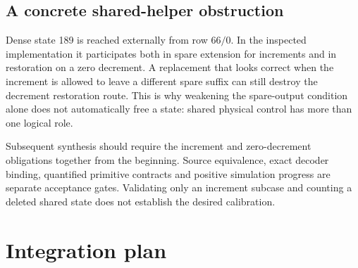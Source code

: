 \documentclass[11pt,letterpaper]{article}
\theoremstyle{definition}\newtheorem{definition}[theorem]{Definition}
\begin{document}
\subsection{A concrete shared-helper obstruction}

Dense state 189 is reached externally from row $66/0$. In the inspected
implementation it participates both in spare extension for increments and in
restoration on a zero decrement. A replacement that looks correct when the
increment is allowed to leave a different spare suffix can still destroy the
decrement restoration route. This is why weakening the spare-output condition
alone does not automatically free a state: shared physical control has more
than one logical role.



Subsequent synthesis should require the increment and zero-decrement
obligations together from the beginning. Source equivalence, exact decoder
binding, quantified primitive contracts and positive simulation progress are
separate acceptance gates. Validating only an increment subcase and counting
a deleted shared state does not establish the desired calibration.

\section{Integration plan}
\end{document}
